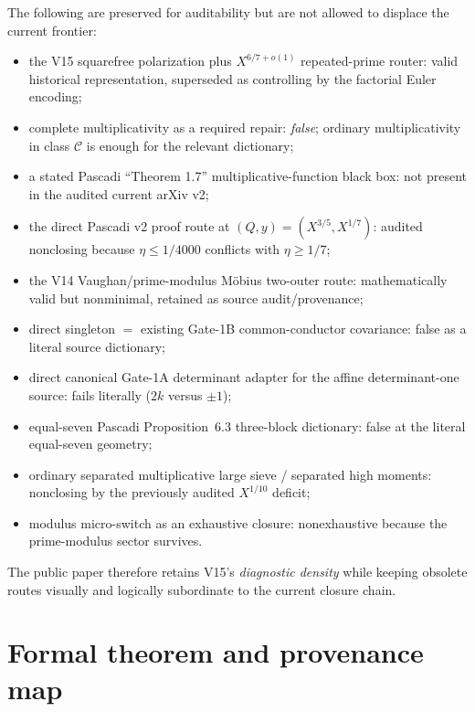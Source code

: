 \documentclass[11pt]{article}
\theoremstyle{definition}
\newcommand{\1}{\mathbf 1}
\begin{document}
{{{The following are preserved for auditability but are not allowed to displace the current
frontier:
\begin{itemize}[leftmargin=1.6em]
\item the V15 squarefree polarization plus $X^{6/7+o(1)}$ repeated-prime router:
  valid historical representation, superseded as controlling by the factorial Euler encoding;
\item complete multiplicativity as a required repair: \emph{false}; ordinary multiplicativity
  in class $\mathcal C$ is enough for the relevant dictionary;
\item a stated Pascadi ``Theorem 1.7'' multiplicative-function black box:
  not present in the audited current arXiv v2;
\item the direct Pascadi v2 proof route at $(Q,y)=(X^{3/5},X^{1/7})$:
  audited nonclosing because $\eta\le1/4000$ conflicts with $\eta\ge1/7$;
\item the V14 Vaughan/prime-modulus M\"obius two-outer route:
  mathematically valid but nonminimal, retained as source audit/provenance;
\item direct singleton $=$ existing Gate-1B common-conductor covariance:
  false as a literal source dictionary;
\item direct canonical Gate-1A determinant adapter for the affine determinant-one source:
  fails literally ($2k$ versus $\pm1$);
\item equal-seven Pascadi Proposition~6.3 three-block dictionary:
  false at the literal equal-seven geometry;
\item ordinary separated multiplicative large sieve / separated high moments:
  nonclosing by the previously audited $X^{1/10}$ deficit;
\item modulus micro-switch as an exhaustive closure:
  nonexhaustive because the prime-modulus sector survives.
\end{itemize}

The public paper therefore retains V15's \emph{diagnostic density} while keeping obsolete
routes visually and logically subordinate to the current closure chain.


\appendix
\section{Formal theorem and provenance map}

}}}
\end{document}
